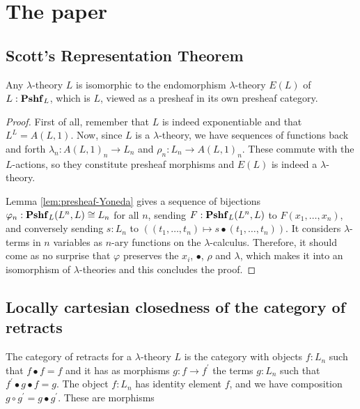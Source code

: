 \chapter{The paper}

\section{Scott's Representation Theorem}
\begin{theorem}
  Any $ \lambda $-theory $ L $ is isomorphic to the endomorphism $ \lambda $-theory $ E(L) $ of $ L: \mathbf{Pshf}_{L} $, which is $ L $, viewed as a presheaf in its own presheaf category.
\end{theorem}
\begin{proof}
  First of all, remember that $ L $ is indeed exponentiable and that $ L^L = A(L, 1) $.
  Now, since $ L $ is a $ \lambda $-theory, we have sequences of functions back and forth $ \lambda_n: A(L, 1)_n \to L_n $ and $ \rho_n: L_n \to A(L, 1)_n $. These commute with the $ L $-actions, so they constitute presheaf morphisms and $ E(L) $ is indeed a $ \lambda $-theory.

  Lemma \ref{lem:presheaf-Yoneda} gives a sequence of bijections $ \varphi_n : \mathbf{Pshf}_{L}(L^n, L) \cong L_n $ for all $ n $, sending $ F: \mathbf{Pshf}_{L}(L^n, L) $ to $ F(x_1, \dots, x_n) $, and conversely sending $ s: L_n $ to $ ((t_1, \dots, t_n) \mapsto s \bullet (t_1, \dots, t_n)) $. It considers $ \lambda $-terms in $ n $ variables as $ n $-ary functions on the $ \lambda $-calculus. Therefore, it should come as no surprise that $ \varphi $ preserves the $ x_i $, $ \bullet $, $ \rho $ and $ \lambda $, which makes it into an isomorphism of $ \lambda $-theories and this concludes the proof.
\end{proof}

\section{Locally cartesian closedness of the category of retracts}
\begin{definition}
  The category of retracts for a $ \lambda $-theory $ L $ is the category with objects $ f: L_n $ such that $ f \bullet f = f $ and it has as morphisms $ g: f \to f^\prime $ the terms $ g: L_n $ such that $ f^\prime \bullet g \bullet f = g $. The object $ f: L_n $ has identity element $ f $, and we have composition $ g \circ g^\prime = g \bullet g^\prime $. These are morphisms \TODO
\end{definition}

